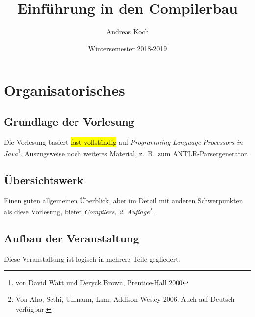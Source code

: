 \documentclass[ngerman]{scrartcl}
\title{Einführung in den Compilerbau}
\date{Wintersemester 2018-2019}
\author{Andreas Koch}
\begin{document}
  \maketitle
  \tableofcontents
  \newpage
  
  
  \section{Organisatorisches}
   
  \subsection{Grundlage der Vorlesung}
   
  Die Vorlesung basiert \hl{fast vollständig} auf \emph{Programming Language Processors in Java}\footnote{von David Watt und Deryck Brown, Prentice-Hall 2000}. Auszugsweise noch weiteres Material, z.\ B.\ zum ANTLR-Parsergenerator.
  
  \subsection{Übersichtswerk}
  
  Einen guten allgemeinen Überblick, aber im Detail mit anderen Schwerpunkten als diese Vorlesung, bietet \emph{Compilers, 2. Auflage}\footnote{Von Aho, Sethi, Ullmann, Lam, Addison-Wesley 2006. Auch auf Deutsch verfügbar.}.
   
  \subsection{Aufbau der Veranstaltung}
  
  Diese Veranstaltung ist logisch in mehrere Teile gegliedert.
  
\end{document}
